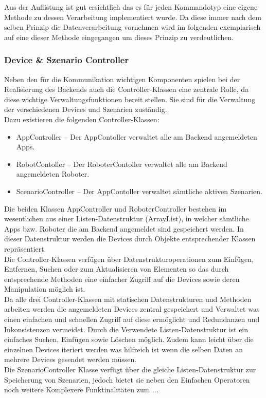 Aus der Auflistung ist gut ersichtlich das es für jeden Kommandotyp eine eigene Methode zu dessen Verarbeitung implementiert wurde.
Da diese immer nach dem selben Prinzip die Datenverarbeitung vornehmen wird im folgenden exemplarisch auf eine dieser Methode 
eingegangen um dieses Prinzip zu verdeutlichen. \\

\subsubsection{Device \& Szenario Controller}
Neben den für die Kommunikation wichtigen Komponenten spielen bei der Realisierung des Backends auch die Controller-Klassen eine 
zentrale Rolle, da diese wichtige Verwaltungsfunktionen bereit stellen. Sie sind für die Verwaltung der verschiedenen Devices 
und Szenarien zuständig. \\
Dazu existieren die folgenden Controller-Klassen:
\begin{itemize}
	\item{AppController} -- Der AppContoller verwaltet alle am Backend angemeldeten Apps.
	\item{RobotContoller} -- Der RoboterContoller verwaltet alle am Backend angemeldeten Roboter.
	\item{ScenarioController} -- Der AppContoller verwaltet sämtliche aktiven Szenarien.
\end{itemize}
Die beiden Klassen AppController und RoboterController bestehen im wesentlichen aus einer Listen-Datenstruktur (ArrayList), in 
welcher sämtliche Apps bzw. Roboter die am Backend angemeldet sind gespeichert werden. In dieser Datenstruktur werden die Devices 
durch Objekte entsprechender Klassen repräsentiert. \\
Die Controller-Klassen verfügen über Datenstrukturoperationen zum Einfügen, Entfernen, Suchen oder zum Aktualisieren von Elementen
so das durch entsprechende Methoden eine einfacher Zugriff auf die Devices sowie deren Manipulation möglich ist. \\
Da alle drei Controller-Klassen mit statischen Datenstrukturen und Methoden arbeiten werden die angemeldeten Devices zentral 
gespeichert und Verwaltet was einen einfachen und schnellen Zugriff auf diese ermöglicht und Redundanzen und Inkonsistenzen vermeidet.
Durch die Verwendete Listen-Datenstruktur ist ein einfaches Suchen, Einfügen sowie Löschen möglich. Zudem kann leicht über die 
einzelnen Devices iteriert werden was hilfreich ist wenn die selben Daten an mehrere Devices gesendet werden müssen.
\\
Die SzenarioController Klasse verfügt über die gleiche Listen-Datenstruktur zur Speicherung von Szenarien, jedoch bietet sie neben
den Einfachen Operatoren noch weitere Komplexere Funktinalitäten zum ... 
